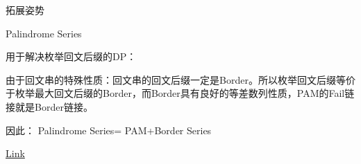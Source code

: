 \documentclass{ctexbeamer}		%
\begin{document}
\begin{frame}{拓展姿势}

\begin{block}{Palindrome Series}

用于解决枚举回文后缀的DP：

由于回文串的特殊性质：回文串的回文后缀一定是Border。所以枚举回文后缀等价于枚举最大回文后缀的Border，而Border具有良好的等差数列性质，PAM的Fail链接就是Border链接。

因此： Palindrome Series= PAM+Border Series

\href{https://zhuanlan.zhihu.com/p/92874690}{\color{blue}Link}
\end{block}    
\end{frame}
\end{document}
